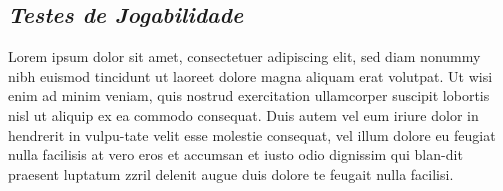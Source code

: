 \subsection{\textit{Testes de Jogabilidade}}
\label{secao:Playtest}
Lorem ipsum dolor sit amet, consectetuer adipiscing elit, sed diam nonummy nibh euismod tincidunt ut laoreet dolore magna aliquam erat volutpat. Ut wisi enim ad minim veniam, quis nostrud exercitation ullamcorper suscipit lobortis nisl ut aliquip ex ea commodo consequat. Duis autem vel eum iriure dolor in hendrerit in vulpu-tate velit esse molestie consequat, vel illum dolore eu feugiat nulla facilisis at vero eros et accumsan et iusto odio dignissim qui blan-dit praesent luptatum zzril delenit augue duis dolore te feugait nulla facilisi.
